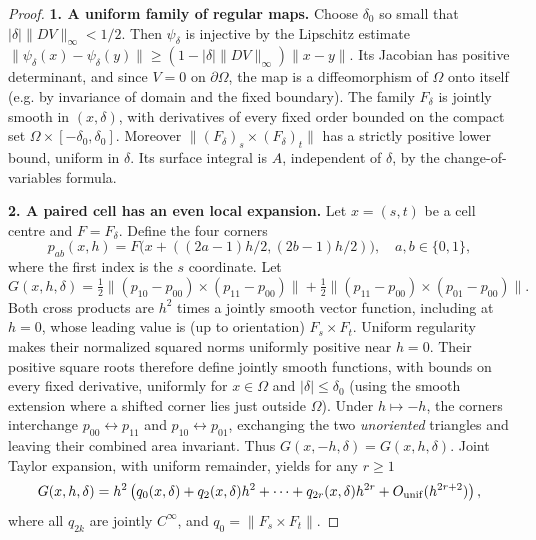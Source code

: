 \documentclass[11pt]{article}
\begin{document}
\begin{proof}
\textbf{1. A uniform family of regular maps.} Choose $\delta_0$ so small that $|\delta|\|DV\|_\infty<1/2$. Then $\psi_\delta$ is injective by the Lipschitz estimate
$\|\psi_\delta(x)-\psi_\delta(y)\|\ge (1-|\delta|\|DV\|_\infty)\|x-y\|$. Its Jacobian has positive determinant, and since $V=0$ on $\partial\Omega$, the map is a diffeomorphism of $\Omega$ onto itself (e.g. by invariance of domain and the fixed boundary). The family $F_\delta$ is jointly smooth in $(x,\delta)$, with derivatives of every fixed order bounded on the compact set $\Omega\times[-\delta_0,\delta_0]$. Moreover $\|(F_\delta)_s\times(F_\delta)_t\|$ has a strictly positive lower bound, uniform in $\delta$. Its surface integral is $A$, independent of $\delta$, by the change-of-variables formula.

\textbf{2. A paired cell has an even local expansion.} Let $x=(s,t)$ be a cell centre and $F=F_\delta$. Define the four corners
\[
p_{ab}(x,h)=F\bigl(x+((2a-1)h/2,(2b-1)h/2)\bigr),\quad a,b\in\{0,1\},
\]
where the first index is the $s$ coordinate. Let
\[
G(x,h,\delta)=\tfrac12\|(p_{10}-p_{00})\times(p_{11}-p_{00})\|
+\tfrac12\|(p_{11}-p_{00})\times(p_{01}-p_{00})\|.
\]
Both cross products are $h^2$ times a jointly smooth vector function, including at $h=0$, whose leading value is (up to orientation) $F_s\times F_t$. Uniform regularity makes their normalized squared norms uniformly positive near $h=0$. Their positive square roots therefore define jointly smooth functions, with bounds on every fixed derivative, uniformly for $x\in\Omega$ and $|\delta|\le\delta_0$ (using the smooth extension where a shifted corner lies just outside $\Omega$).
Under $h\mapsto-h$, the corners interchange $p_{00}\leftrightarrow p_{11}$ and $p_{10}\leftrightarrow p_{01}$, exchanging the two \emph{unoriented} triangles and leaving their combined area invariant. Thus $G(x,-h,\delta)=G(x,h,\delta)$. Joint Taylor expansion, with uniform remainder, yields for any $r\ge1$
\[
G(x,h,\delta)=h^2\left(q_0(x,\delta)+q_2(x,\delta)h^2+\cdots+q_{2r}(x,\delta)h^{2r}+O_{\rm unif}(h^{2r+2})\right),
\]
where all $q_{2k}$ are jointly $C^\infty$, and $q_0=\|F_s\times F_t\|$.


\end{proof}
\end{document}
